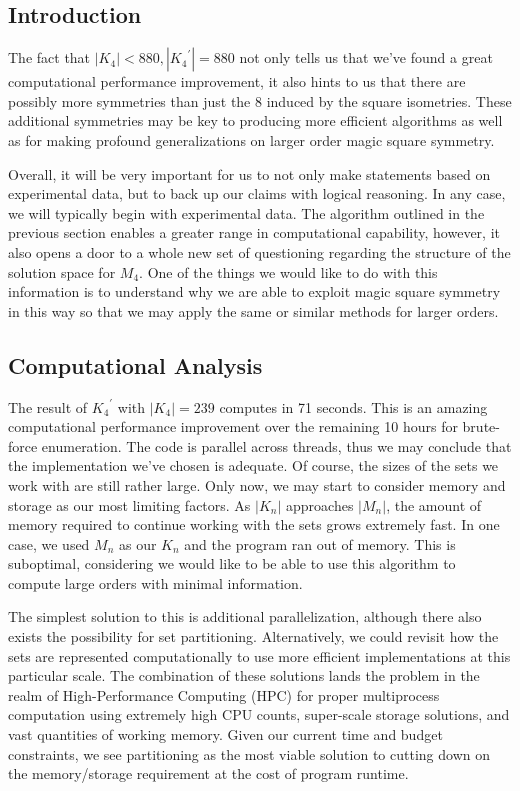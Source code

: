 \documentclass{rhumj_new}
\begin{document}
\subsection{Introduction}

The fact that $\left|K_4\right|< 880, \left|{K_4}^\prime\right|=880$ not only tells us that we've
found a great computational performance improvement, it also hints to us that there are possibly
more symmetries than just the 8 induced by the square isometries. These additional symmetries may
be key to producing more efficient algorithms as well as for making profound generalizations on
larger order magic square symmetry.

Overall, it will be very important for us to not only make statements based on experimental data,
but to back up our claims with logical reasoning. In any case, we will typically begin with
experimental data. The algorithm outlined in the previous section enables a greater range in
computational capability, however, it also opens a door to a whole new set of questioning regarding
the structure of the solution space for $M_4$. One of the things we would like to do with this
information is to understand why we are able to exploit magic square symmetry in this way so that
we may apply the same or similar methods for larger orders.

\subsection{Computational Analysis}

The result of ${K_4}^\prime$ with $\left|K_4\right|=239$ computes in 71 seconds. This is an amazing
computational performance improvement over the remaining 10 hours for brute-force enumeration. The
code is parallel across threads, thus we may conclude that the implementation we've chosen is
adequate. Of course, the sizes of the sets we work with are still rather large. Only now, we may
start to consider memory and storage as our most limiting factors. As $\left|K_n\right|$ approaches
$\left|M_n\right|$, the amount of memory required to continue working with the sets grows extremely
fast. In one case, we used $M_n$ as our $K_n$ and the program ran out of memory. This is
suboptimal, considering we would like to be able to use this algorithm to compute large orders with
minimal information.

The simplest solution to this is additional parallelization, although there also exists the
possibility for set partitioning. Alternatively, we could revisit how the sets are represented
computationally to use more efficient implementations at this particular scale. The combination of
these solutions lands the problem in the realm of High-Performance Computing (HPC) for proper
multiprocess computation using extremely high CPU counts, super-scale storage solutions, and vast
quantities of working memory. Given our current time and budget constraints, we see partitioning as
the most viable solution to cutting down on the memory/storage requirement at the cost of program
runtime.
\end{document}
